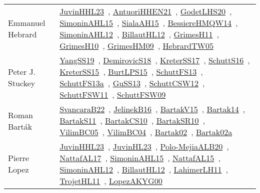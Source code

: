{\begin{longtable}{p{4cm}p{20cm}}
Emmanuel Hebrard & \href{works/JuvinHHL23.pdf}{JuvinHHL23}~\cite{JuvinHHL23}, \href{works/AntuoriHHEN21.pdf}{AntuoriHHEN21}~\cite{AntuoriHHEN21}, \href{works/GodetLHS20.pdf}{GodetLHS20}~\cite{GodetLHS20}, \href{works/SimoninAHL15.pdf}{SimoninAHL15}~\cite{SimoninAHL15}, \href{works/SialaAH15.pdf}{SialaAH15}~\cite{SialaAH15}, \href{works/BessiereHMQW14.pdf}{BessiereHMQW14}~\cite{BessiereHMQW14}, \href{works/SimoninAHL12.pdf}{SimoninAHL12}~\cite{SimoninAHL12}, \href{works/BillautHL12.pdf}{BillautHL12}~\cite{BillautHL12}, \href{works/GrimesH11.pdf}{GrimesH11}~\cite{GrimesH11}, \href{works/GrimesH10.pdf}{GrimesH10}~\cite{GrimesH10}, \href{works/GrimesHM09.pdf}{GrimesHM09}~\cite{GrimesHM09}, \href{works/HebrardTW05.pdf}{HebrardTW05}~\cite{HebrardTW05}\\
Peter J. Stuckey & \href{works/YangSS19.pdf}{YangSS19}~\cite{YangSS19}, \href{works/DemirovicS18.pdf}{DemirovicS18}~\cite{DemirovicS18}, \href{works/KreterSS17.pdf}{KreterSS17}~\cite{KreterSS17}, \href{works/SchuttS16.pdf}{SchuttS16}~\cite{SchuttS16}, \href{works/KreterSS15.pdf}{KreterSS15}~\cite{KreterSS15}, \href{works/BurtLPS15.pdf}{BurtLPS15}~\cite{BurtLPS15}, \href{works/SchuttFS13.pdf}{SchuttFS13}~\cite{SchuttFS13}, \href{works/SchuttFS13a.pdf}{SchuttFS13a}~\cite{SchuttFS13a}, \href{works/GuSS13.pdf}{GuSS13}~\cite{GuSS13}, \href{works/SchuttCSW12.pdf}{SchuttCSW12}~\cite{SchuttCSW12}, \href{works/SchuttFSW11.pdf}{SchuttFSW11}~\cite{SchuttFSW11}, \href{works/SchuttFSW09.pdf}{SchuttFSW09}~\cite{SchuttFSW09}\\
Roman Bart{\'{a}}k & \href{}{SvancaraB22}~\cite{SvancaraB22}, \href{works/JelinekB16.pdf}{JelinekB16}~\cite{JelinekB16}, \href{}{BartakV15}~\cite{BartakV15}, \href{}{Bartak14}~\cite{Bartak14}, \href{works/BartakS11.pdf}{BartakS11}~\cite{BartakS11}, \href{works/BartakCS10.pdf}{BartakCS10}~\cite{BartakCS10}, \href{works/BartakSR10.pdf}{BartakSR10}~\cite{BartakSR10}, \href{works/VilimBC05.pdf}{VilimBC05}~\cite{VilimBC05}, \href{works/VilimBC04.pdf}{VilimBC04}~\cite{VilimBC04}, \href{works/Bartak02.pdf}{Bartak02}~\cite{Bartak02}, \href{works/Bartak02a.pdf}{Bartak02a}~\cite{Bartak02a}\\
Pierre Lopez & \href{works/JuvinHHL23.pdf}{JuvinHHL23}~\cite{JuvinHHL23}, \href{works/JuvinHL23.pdf}{JuvinHL23}~\cite{JuvinHL23}, \href{}{Polo-MejiaALB20}~\cite{Polo-MejiaALB20}, \href{works/NattafAL17.pdf}{NattafAL17}~\cite{NattafAL17}, \href{works/SimoninAHL15.pdf}{SimoninAHL15}~\cite{SimoninAHL15}, \href{works/NattafAL15.pdf}{NattafAL15}~\cite{NattafAL15}, \href{works/SimoninAHL12.pdf}{SimoninAHL12}~\cite{SimoninAHL12}, \href{works/BillautHL12.pdf}{BillautHL12}~\cite{BillautHL12}, \href{works/LahimerLH11.pdf}{LahimerLH11}~\cite{LahimerLH11}, \href{works/TrojetHL11.pdf}{TrojetHL11}~\cite{TrojetHL11}, \href{works/LopezAKYG00.pdf}{LopezAKYG00}~\cite{LopezAKYG00}\\

\end{longtable}}
